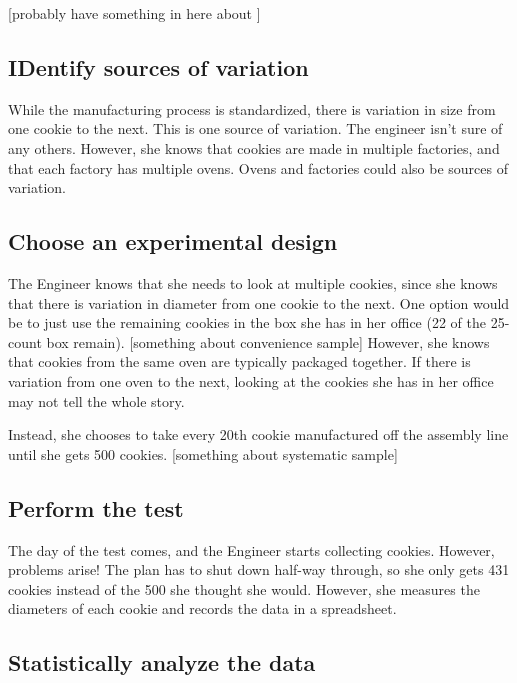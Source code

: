 \documentclass[]{book}
\theoremstyle{definition}
\theoremstyle{definition}
\theoremstyle{definition}
\theoremstyle{remark}
\begin{document}
{[}probably have something in here about {]}

\subsection{IDentify sources of
variation}\label{identify-sources-of-variation}

While the manufacturing process is standardized, there is variation in
size from one cookie to the next. This is one source of variation. The
engineer isn't sure of any others. However, she knows that cookies are
made in multiple factories, and that each factory has multiple ovens.
Ovens and factories could also be sources of variation.

\subsection{Choose an experimental
design}\label{choose-an-experimental-design-2}

The Engineer knows that she needs to look at multiple cookies, since she
knows that there is variation in diameter from one cookie to the next.
One option would be to just use the remaining cookies in the box she has
in her office (22 of the 25-count box remain). {[}something about
convenience sample{]} However, she knows that cookies from the same oven
are typically packaged together. If there is variation from one oven to
the next, looking at the cookies she has in her office may not tell the
whole story.

Instead, she chooses to take every 20th cookie manufactured off the
assembly line until she gets 500 cookies. {[}something about systematic
sample{]}

\subsection{Perform the test}\label{perform-the-test}

The day of the test comes, and the Engineer starts collecting cookies.
However, problems arise! The plan has to shut down half-way through, so
she only gets 431 cookies instead of the 500 she thought she would.
However, she measures the diameters of each cookie and records the data
in a spreadsheet.

\subsection{Statistically analyze the
data}\label{statistically-analyze-the-data-2}
\end{document}
